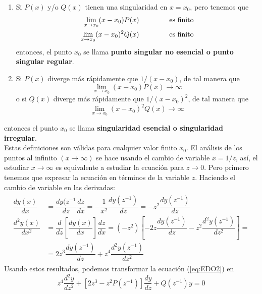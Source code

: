 \begin{enumerate}
\item Si $P(x)$ y/o $Q(x)$ tienen una singularidad en $x = x_{0}$, pero tenemos que
\begin{eqnarray}
\lim_{x \to x_{0}} (x - x_{0}) P(x) \hspace{1.5cm} \text{es finito} \\
\lim_{x \to x_{0}} (x - x_{0})^{2} Q(x) \hspace{1.5cm} \text{es finito}
\end{eqnarray} 
entonces, el punto $x_{0}$ se llama \textbf{punto singular no esencial o punto singular regular}.
\item Si $P(x)$ diverge más rápidamente que $1/(x-x_{0})$, de tal manera que 
\begin{equation}
\lim_{x \to x_{0}} (x - x_{0}) P(x) \rightarrow \infty
\end{equation}
o si $Q(x)$ diverge más rápidamente que $1/(x-x_{0})^{2}$, de tal manera que
\begin{equation}
\lim_{x \to x_{0}} (x - x_{0})^{2} Q(x) \rightarrow \infty
\end{equation}
\end{enumerate}
entonces el punto $x_{0}$ se llama \textbf{singularidad esencial o singularidad irregular}.
\\
Estas definiciones son válidas para cualquier valor finito $x_{0}$. El análisis de los puntos al infinito $(x \to \infty)$ se hace usando el cambio de variable $x = 1/z$, así, el estudiar $x \to \infty$ es equivalente a estudiar la ecuación para $z \to 0$. Pero primero tenemos que expresar la ecuación en términos de la variable $z$. Haciendo el cambio de variable en las derivadas:
\begin{eqnarray}
\begin{aligned}
\dfrac{dy(x)}{dx} &= \dfrac{d y(z^{-1}}{d z} \dfrac{dz}{dx} = - \dfrac{1}{x^{2}} \dfrac{dy(z^{-1})}{dz} = -z^{2} \dfrac{dy(z^{-1})}{dz} \\
\dfrac{d^{2} y(x)}{d x^{2}} &= \dfrac{d}{dz} \left[ \dfrac{dy(x)}{dx} \right] \dfrac{dz}{dx} = (-z^{2}) \left[ -2z \dfrac{dy(z^{-1})}{dz} - z^{2} \dfrac{d^{2} y(z^{-1})}{dz^{2}} \right] = \\
 &= 2z^{3} \dfrac{dy(z^{-1})}{dz} + z^{4} \dfrac{d^{2}y(z^{-1})}{dz^{2}}
\end{aligned}
\end{eqnarray}
Usando estos resultados, podemos transformar la ecuación (\ref{eq:EDO2}) en
\begin{equation}
z^{4} \dfrac{d^{2} y}{d z^{2}} + [ 2 z^{3} - z^{2} P(z^{-1})] \dfrac{d y}{d z} + Q(z^{-1}) y = 0 \label{eq:EDO2_en_Z}
\end{equation}
